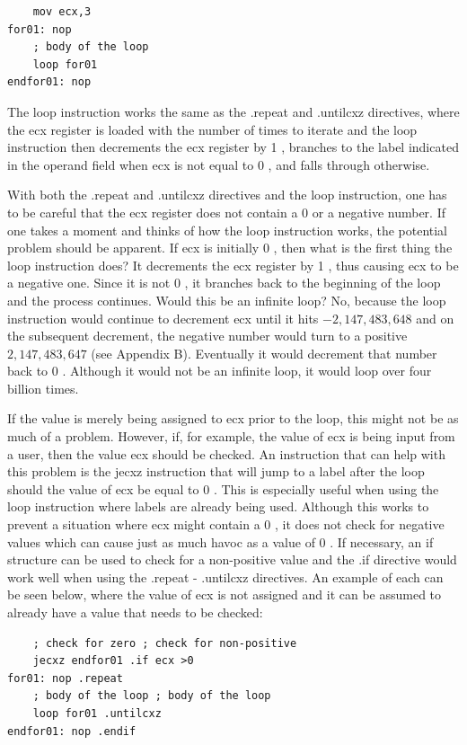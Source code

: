 \documentclass[10pt]{book}
\begin{document}
\begin{verbatim}
    mov ecx,3
for01: nop
    ; body of the loop
    loop for01
endfor01: nop
\end{verbatim}

The loop instruction works the same as the .repeat and .untilcxz directives, where the ecx register is loaded with the number of times to iterate and the loop instruction then decrements the ecx register by 1 , branches to the label indicated in the operand field when ecx is not equal to 0 , and falls through otherwise.

With both the .repeat and .untilcxz directives and the loop instruction, one has to be careful that the ecx register does not contain a 0 or a negative number. If one takes a moment and thinks of how the loop instruction works, the potential problem should be apparent. If ecx is initially 0 , then what is the first thing the loop instruction does? It decrements the ecx register by 1 , thus causing ecx to be a negative one. Since it is not 0 , it branches back to the beginning of the loop and the process continues. Would this be an infinite loop? No, because the loop instruction would continue to decrement ecx until it hits $-2,147,483,648$ and on the subsequent decrement, the negative number would turn to a positive $2,147,483,647$ (see Appendix B). Eventually it would decrement that number back to 0 . Although it would not be an infinite loop, it would loop over four billion times.

If the value is merely being assigned to ecx prior to the loop, this might not be as much of a problem. However, if, for example, the value of ecx is being input from a user, then the value ecx should be checked. An instruction that can help with this problem is the jecxz instruction that will jump to a label after the loop should the value of ecx be equal to 0 . This is especially useful when using the loop instruction where labels are already being used. Although this works to prevent a situation where ecx might contain a 0 , it does not check for negative values which can cause just as much havoc as a value of 0 . If necessary, an if structure can be used to check for a non-positive value and the .if directive would\\
work well when using the .repeat - .untilcxz directives. An example of each can be seen below, where the value of ecx is not assigned and it can be assumed to already have a value that needs to be checked:


\begin{verbatim}
    ; check for zero ; check for non-positive
    jecxz endfor01 .if ecx >0
for01: nop .repeat
    ; body of the loop ; body of the loop
    loop for01 .untilcxz
endfor01: nop .endif
\end{verbatim}
\end{document}
